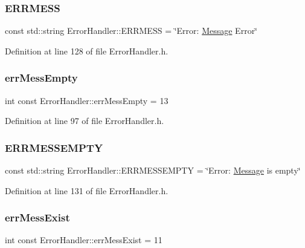 \subsubsection{\texorpdfstring{ERRMESS}{ERRMESS}}
{\footnotesize\ttfamily const std\+::string Error\+Handler\+::\+E\+R\+R\+M\+E\+SS = \char`\"{}Error\+: \mbox{\hyperlink{classMessage}{Message}} Error\char`\"{}\hspace{0.3cm}{\ttfamily [static]}}



Definition at line 128 of file Error\+Handler.\+h.

\mbox{\label{classErrorHandler_add483ce97592710530c6f746c99c598d}} 
\subsubsection{\texorpdfstring{errMessEmpty}{errMessEmpty}}
{\footnotesize\ttfamily int const Error\+Handler\+::err\+Mess\+Empty = 13\hspace{0.3cm}{\ttfamily [static]}}



Definition at line 97 of file Error\+Handler.\+h.

\mbox{\label{classErrorHandler_a28d8ef2ee23112d4895dd60788c1b152}} 
\subsubsection{\texorpdfstring{ERRMESSEMPTY}{ERRMESSEMPTY}}
{\footnotesize\ttfamily const std\+::string Error\+Handler\+::\+E\+R\+R\+M\+E\+S\+S\+E\+M\+P\+TY = \char`\"{}Error\+: \mbox{\hyperlink{classMessage}{Message}} is empty\char`\"{}\hspace{0.3cm}{\ttfamily [static]}}



Definition at line 131 of file Error\+Handler.\+h.

\mbox{\label{classErrorHandler_a94d4ea423c97ff7a4784ff0043731783}} 
\subsubsection{\texorpdfstring{errMessExist}{errMessExist}}
{\footnotesize\ttfamily int const Error\+Handler\+::err\+Mess\+Exist = 11\hspace{0.3cm}{\ttfamily [static]}}



